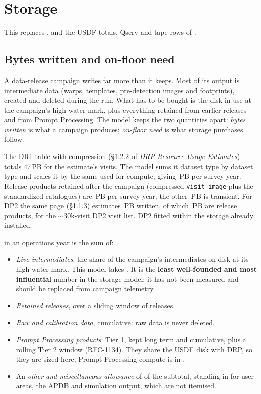 \section{Storage}\label{sec:upstorage}

This replaces , and the USDF totals, Qserv and
tape rows of .

\subsection{Bytes written and on-floor need}

A data-release campaign writes far more than it keeps. Most of its output is
intermediate data (warps, templates, pre-detection images and footprints),
created and deleted during the run. What has to be bought is the disk in use
at the campaign's high-water mark, plus everything retained from earlier
releases and from Prompt Processing. The model keeps the two quantities
apart: \emph{bytes written} is what a campaign produces; \emph{on-floor need}
is what storage purchases follow.

The DR1 table with compression (\S1.2.2 of \emph{DRP Resource Usage
Estimates}) totals 47\,PB for the estimate's \smDRoneVisits{} visits. The model
sums it dataset type by dataset type and scales it by the same \smYrScale{}
used for compute, giving \smBytesWrittenPB{}\,PB per survey year. Release
products retained after the campaign (compressed \texttt{visit\_image} plus
the standardized catalogues) are \smRetainedPB{}\,PB per survey year; the other
\smIntermediatesPB{}\,PB is transient. For DP2 the same page (\S1.1.3)
estimates \smDPtwoOutPB{}\,PB written, of which \smDPtwoRelPB{}\,PB are release
products, for the $\sim$30k-visit DP2 visit list. DP2 fitted within the storage
already installed.

 in an operations year is the sum of:
\begin{itemize}
\item \emph{Live intermediates}: the share of the campaign's intermediates on
      disk at its high-water mark. This model takes \smLiveFrac{}. It is the
      \textbf{least well-founded and most influential} number in the storage
      model; it has not been measured and should be replaced from campaign
      telemetry.
\item \emph{Retained releases}, over a sliding window of \smRetWin{}
      releases.
\item \emph{Raw and calibration data}, cumulative: raw data is never deleted.
\item \emph{Prompt Processing products}: Tier 1, kept long term and
      cumulative, plus a rolling Tier 2 window (RFC-1134). They share the
      USDF disk with DRP, so they are sized here; Prompt Processing compute is
      in .
\item An \emph{other and miscellaneous allowance} of \smOtherFrac{} of the
      subtotal, standing in for user areas, the APDB and simulation output,
      which are not itemised.
\end{itemize}

